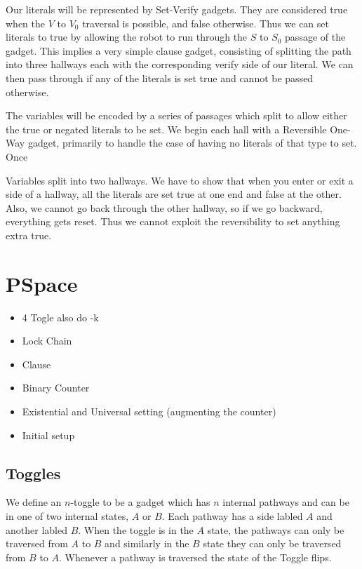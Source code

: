 \documentclass[11pt]{article}
\begin{document}
Our literals will be represented by Set-Verify gadgets. They are considered true when the $V$ to $V_0$ traversal is possible, and false otherwise. Thus we can set literals to true by allowing the robot to run through the $S$ to $S_0$ passage of the gadget. This implies a very simple clause gadget, consisting of splitting the path into three hallways each with the corresponding verify side of our literal. We can then pass through if any of the literals is set true and cannot be passed otherwise.

The variables will be encoded by a series of passages which split to allow either the true or negated literals to be set. We begin each hall with a Reversible One-Way gadget, primarily to handle the case of having no literals of that type to set. Once 

Variables split into two hallways. We have to show that when you enter or exit a side of a hallway, all the literals are set true at one end and false at the other. Also, we cannot go back through the other hallway, so if we go backward, everything gets reset. Thus we cannot exploit the reversibility to set anything extra true.


\section{PSpace}

\begin{itemize}
\item 4 Togle also do -k
\item Lock Chain
\item Clause
\item Binary Counter
\item Existential and Universal setting (augmenting the counter)
\item Initial setup

\end{itemize}

\subsection{Toggles}
We define an $n$-toggle to be a gadget which has $n$ internal pathways and can be in one of two internal states, $A$ or $B$. Each pathway has a side labled $A$ and another labled $B$. When the toggle is in the $A$ state, the pathways can only be traversed from $A$ to $B$ and similarly in the $B$ state they can only be traversed from $B$ to $A$. Whenever a pathway is traversed the state of the Toggle flips.
\end{document}
